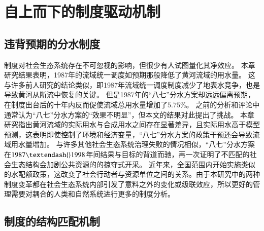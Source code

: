 \section{自上而下的制度驱动机制}

\subsection{违背预期的分水制度}

制度对社会\textendash{}生态系统存在不可忽视的影响，但很少有人试图量化其净效应\cite{cumming2020a}。
本章研究结果表明，1987年的流域统一调度如预期那般降低了黄河流域的用水量。
这与许多前人研究的结论类似，即1987年流域统一调度制度减少了地表水竞争，也是导致黄河从断流中恢复的关键\cite{chen2021,huangang2002,an2007}。
但是1987年的“八七”分水方案却远远偏离预期，在制度出台后的十年内反而促使流域总用水量增加了$5.75\%$。
之前的分析和评论中通常认为“八七”分水方案的“效果不明显”，但本文的结果对此提出了挑战。
本章研究指出黄河流域的实际用水与合成用水之间存在显著差异，且实际用水高于模型预测\cite{abadie2015,hill2021}，这表明即使控制了环境和经济变量，“八七”分水方案的政策干预还会导致流域用水量增加。
与许多其他社会生态系统治理失败的情况相似，“八七”分水方案在$1987 \textendash{} 1998$年间结果与目标的背道而驰，再一次证明了不匹配的社会生态结构会加剧公共资源的的掠夺式开采\cite{kellenberg2009,cai2016,barnes2019}。
近年来，全国范围内开始实施类似的水配额政策，这改变了社会行动者与资源单位之间的关系。由于本研究中的两种制度变革都在社会\textendash{}生态系统内部引发了意料之外的变化或级联效应，所以更好的管理需要对耦合的人类和自然系统进行更多的制度分析。

%
\subsection{制度的结构匹配机制}

